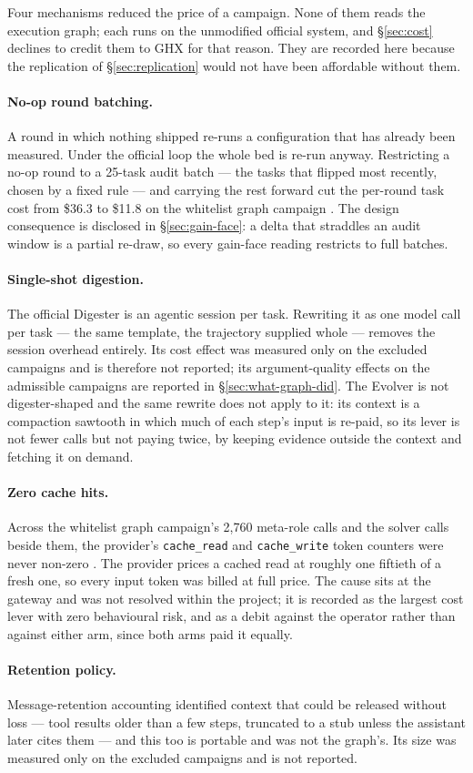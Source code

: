 Four mechanisms reduced the price of a campaign. None of them reads the
execution graph; each runs on the unmodified official system, and
\S\ref{sec:cost} declines to credit them to GHX for that reason. They are
recorded here because the replication of \S\ref{sec:replication} would not
have been affordable without them.

\paragraph{No-op round batching.} A round in which nothing shipped re-runs
a configuration that has already been measured. Under the official loop
the whole bed is re-run anyway. Restricting a no-op round to a 25-task
audit batch --- the tasks that flipped most recently, chosen by a fixed
rule --- and carrying the rest forward cut the per-round task cost from
\$36.3 to \$11.8 on the whitelist graph campaign . The design
consequence is disclosed in \S\ref{sec:gain-face}: a delta that straddles
an audit window is a partial re-draw, so every gain-face reading restricts
to full batches.

\paragraph{Single-shot digestion.} The official Digester is an agentic
session per task. Rewriting it as one model call per task --- the same
template, the trajectory supplied whole --- removes the session overhead
entirely. Its cost effect was measured only on the excluded campaigns and
is therefore not reported; its argument-quality effects on the admissible
campaigns are reported in \S\ref{sec:what-graph-did}. The Evolver is not
digester-shaped and the same rewrite does not apply to it: its context is
a compaction sawtooth in which much of each step's input is re-paid, so
its lever is not fewer calls but not paying twice, by keeping evidence
outside the context and fetching it on demand.

\paragraph{Zero cache hits.} Across the whitelist graph campaign's 2{,}760
meta-role calls and the solver calls beside them, the provider's
\texttt{cache\_read} and \texttt{cache\_write} token counters were never
non-zero . The provider prices a cached read at roughly one fiftieth
of a fresh one, so every input token was billed at full price. The cause
sits at the gateway and was not resolved within the project; it is
recorded as the largest cost lever with zero behavioural risk, and as a
debit against the operator rather than against either arm, since both
arms paid it equally.

\paragraph{Retention policy.} Message-retention accounting identified
context that could be released without loss --- tool results older than a
few steps, truncated to a stub unless the assistant later cites them ---
and this too is portable and was not the graph's. Its size was measured
only on the excluded campaigns and is not reported.
